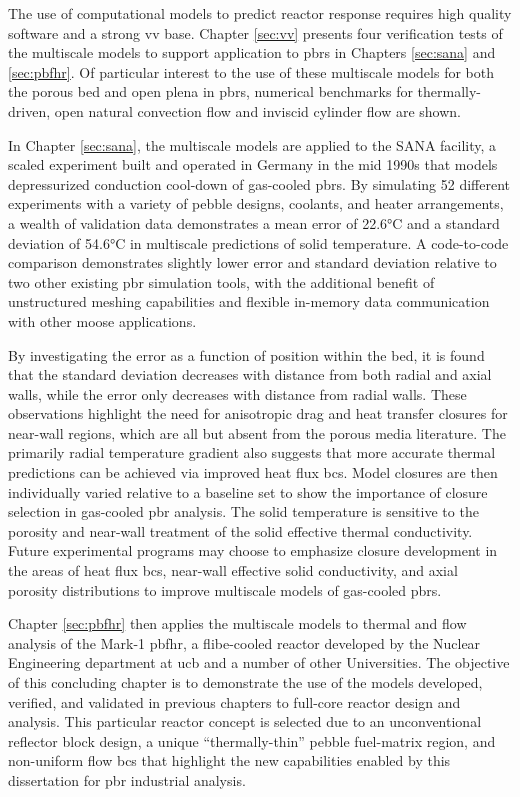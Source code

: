 The use of computational models to predict reactor response requires high quality software and a strong \gls{vv} base. Chapter \ref{sec:vv} presents four verification tests of the multiscale models to support application to \glspl{pbr} in Chapters \ref{sec:sana} and \ref{sec:pbfhr}. Of particular interest to the use of these multiscale models for both the porous bed and open plena in \glspl{pbr}, numerical benchmarks for thermally-driven, open natural convection flow and inviscid cylinder flow are shown. 

In Chapter \ref{sec:sana}, the multiscale models are applied to the SANA facility, a scaled experiment built and operated in Germany in the mid 1990s that models depressurized conduction cool-down of gas-cooled \glspl{pbr}. By simulating 52 different experiments with a variety of pebble designs, coolants, and heater arrangements, a wealth of validation data demonstrates a mean error of 22.6\si{\celsius} and a standard deviation of 54.6\si{\celsius} in multiscale predictions of solid temperature. A code-to-code comparison demonstrates slightly lower error and standard deviation relative to two other existing \gls{pbr} simulation tools, with the additional benefit of unstructured meshing capabilities and flexible in-memory data communication with other \gls{moose} applications.

By investigating the error as a function of position within the bed, it is found that the standard deviation decreases with distance from both radial and axial walls, while the error only decreases with distance from radial walls. These observations highlight the need for anisotropic drag and heat transfer closures for near-wall regions, which are all but absent from the porous media literature. The primarily radial temperature gradient also suggests that more accurate thermal predictions can be achieved via improved heat flux \glspl{bc}. Model closures are then individually varied relative to a baseline set to show the importance of closure selection in gas-cooled \gls{pbr} analysis. The solid temperature is sensitive to the porosity and near-wall treatment of the solid effective thermal conductivity. Future experimental programs may choose to emphasize closure development in the areas of heat flux \glspl{bc}, near-wall effective solid conductivity, and axial porosity distributions to improve multiscale models of gas-cooled \glspl{pbr}.

Chapter \ref{sec:pbfhr} then applies the multiscale models to thermal and flow analysis of the Mark-1 \gls{pbfhr}, a \gls{flibe}-cooled reactor developed by the Nuclear Engineering department at \gls{ucb} and a number of other Universities. The objective of this concluding chapter is to demonstrate the use of the models developed, verified, and validated in previous chapters to full-core reactor design and analysis. This particular reactor concept is selected due to an unconventional reflector block design, a unique ``thermally-thin'' pebble fuel-matrix region, and non-uniform flow \glspl{bc} that highlight the new capabilities enabled by this dissertation for \gls{pbr} industrial analysis.

